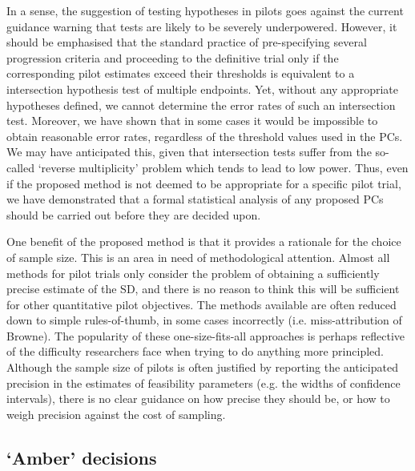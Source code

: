 \documentclass[AMA,STIX1COL]{WileyNJD-v2}
\begin{document}
In a sense, the suggestion of testing hypotheses in pilots goes against the current guidance warning that tests are likely to be severely underpowered. However, it should be emphasised that the standard practice of pre-specifying several progression criteria and proceeding to the definitive trial only if the corresponding pilot estimates exceed their thresholds is equivalent to a intersection hypothesis test of multiple endpoints. Yet, without any appropriate hypotheses defined, we cannot determine the error rates of such an intersection test. Moreover, we have shown that in some cases it would be impossible to obtain reasonable error rates, regardless of the threshold values used in the PCs. We may have anticipated this, given that intersection tests suffer from the so-called `reverse multiplicity' problem which tends to lead to low power. Thus, even if the proposed method is not deemed to be appropriate for a specific pilot trial, we have demonstrated that a formal statistical analysis of any proposed PCs should be carried out before they are decided upon.

One benefit of the proposed method is that it provides a rationale for the choice of sample size. This is an area in need of methodological attention. Almost all methods for pilot trials only consider the problem of obtaining a sufficiently precise estimate of the SD, and there is no reason to think this will be sufficient for other quantitative pilot objectives. The methods available are often reduced down to simple rules-of-thumb, in some cases incorrectly (i.e. miss-attribution of Browne). The popularity of these one-size-fits-all approaches is perhaps reflective of the difficulty researchers face when trying to do anything more principled. Although the sample size of pilots is often justified by reporting the anticipated precision in the estimates of feasibility parameters (e.g. the widths of confidence intervals), there is no clear guidance on how precise they should be, or how to weigh precision against the cost of sampling.

\subsection{`Amber' decisions}
\end{document}
